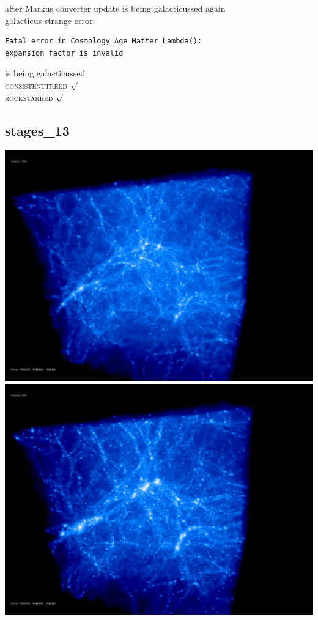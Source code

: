 after Markus converter update 
is being galacticussed again \\
galacticus strange error: 
\begin{verbatim}
Fatal error in Cosmology_Age_Matter_Lambda():
expansion factor is invalid
\end{verbatim}
is being galacticussed \\
\textsc{consistenttreed} $\surd$ \\ 
\textsc{rockstarred} $\surd$

% 
%
%
%
%
%
%
%

\newpage
\subsection{stages\_13}

\includegraphics[scale=0.1]{stages_13/50.jpg} 
\includegraphics[scale=0.1]{stages_13/100.jpg}  \\

